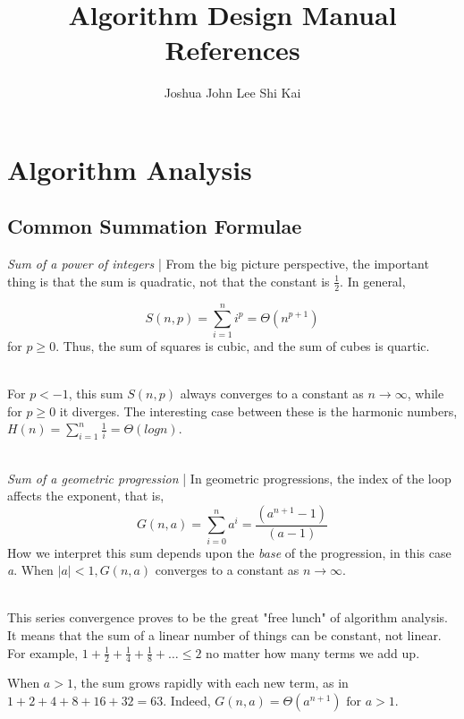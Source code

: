 \documentclass{article}
\title{Algorithm Design Manual References}
\author{Joshua John Lee Shi Kai}
\begin{document}
\section{Algorithm Analysis}
\subsection{Common Summation Formulae}
\textit{Sum of a power of integers} | From the big picture perspective, the important thing is that
the sum is quadratic, not that the constant is $\frac{1}{2}$. In general,

\begin{equation*}
	S(n,p) = \displaystyle\sum_{i=1}^{n} i^p = \Theta (n^{p+1})
\end{equation*}
for $p \geq 0$. Thus, the sum of squares is cubic, and the sum of cubes is quartic.

\noindent \\ For $p < -1$, this sum $S(n,p)$ always converges to a constant as $n \rightarrow \infty$,
while for $p \geq 0$ it diverges. The interesting case between these is the harmonic numbers,
$H(n) = \sum_{i=1}^{n} \frac{1}{i} = \Theta (log n)$.

\noindent \\ \textit{Sum of a geometric progression} | In geometric progressions, the index of the
loop affects the exponent, that is,
\begin{equation*}
	G(n,a) = \displaystyle\sum_{i=0}^{n} a^i = \frac{(a^{n+1} - 1)}{(a-1)}
\end{equation*}
How we interpret this sum depends upon the \textit{base} of the progression, in this case \textit{a}.
When $|a| < 1, G(n, a)$ converges to a constant as $n \rightarrow \infty$.

\noindent \\ This series convergence proves to be the great "free lunch" of algorithm analysis. It means
that the sum of a linear number of things can be constant, not linear. For example, $1+\frac{1}{2} + \frac{1}{4}
	+ \frac{1}{8} + \dots \leq 2$ no matter how many terms we add up.

When $a > 1$, the sum grows rapidly with each new term, as in $1 + 2 +  4 + 8 + 16 + 32 = 63$. Indeed,
$G(n,a) = \Theta (a^{n+1}) \text{ for } a > 1$.
\end{document}
